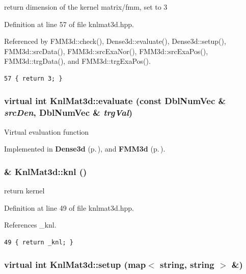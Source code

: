 return dimension of the kernel matrix/fmm, set to 3 

Definition at line 57 of file knlmat3d.hpp.

Referenced by FMM3d::check(), Dense3d::evaluate(), Dense3d::setup(), FMM3d::src\-Data(), FMM3d::src\-Exa\-Nor(), FMM3d::src\-Exa\-Pos(), FMM3d::trg\-Data(), and FMM3d::trg\-Exa\-Pos().

\footnotesize\begin{verbatim}57 { return 3; }
\end{verbatim}\normalsize 


\subsubsection{\setlength{\rightskip}{0pt plus 5cm}virtual int Knl\-Mat3d::evaluate (const Dbl\-Num\-Vec \& {\em src\-Den}, Dbl\-Num\-Vec \& {\em trg\-Val})\hspace{0.3cm}{\tt  [pure virtual]}}\label{classKnlMat3d_fcf3de1e6ce4ee024ef0d320363bd920_fcf3de1e6ce4ee024ef0d320363bd920}


Virtual evaluation function 

Implemented in {\bf Dense3d} {\rm (p.\,\pageref{classDense3d_3d2ce8cfb3d9632d6b69352f1bb5eda2_3d2ce8cfb3d9632d6b69352f1bb5eda2})}, and {\bf FMM3d} {\rm (p.\,\pageref{classFMM3d_3d2ce8cfb3d9632d6b69352f1bb5eda2_3d2ce8cfb3d9632d6b69352f1bb5eda2})}.
\subsubsection{\& Knl\-Mat3d::knl ()\hspace{0.3cm}{\tt  [inline]}}\label{classKnlMat3d_d01911fc223ab4bc9604db12f942194e_d01911fc223ab4bc9604db12f942194e}


return kernel 

Definition at line 49 of file knlmat3d.hpp.

References \_\-knl.

\footnotesize\begin{verbatim}49 { return _knl; }
\end{verbatim}\normalsize 


\subsubsection{\setlength{\rightskip}{0pt plus 5cm}virtual int Knl\-Mat3d::setup (map$<$ string, string $>$ \&)\hspace{0.3cm}{\tt  [pure virtual]}}\label{classKnlMat3d_24cbbecf677cd909a522d252feebf2c6_24cbbecf677cd909a522d252feebf2c6}


